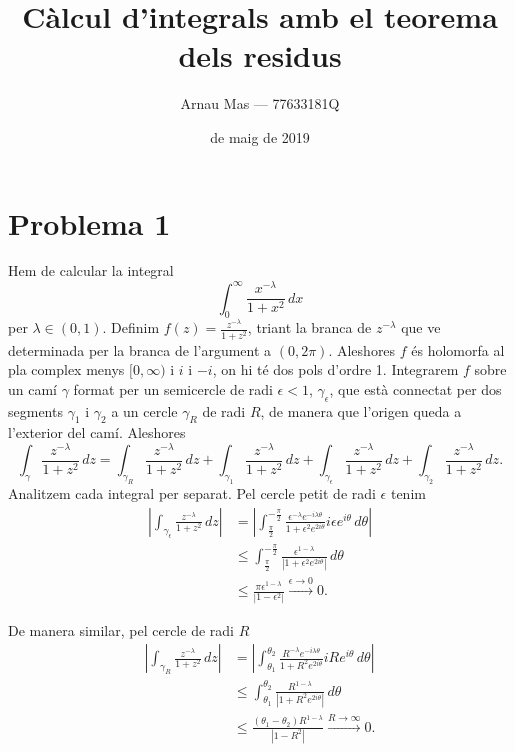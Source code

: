 \documentclass[12pt]{article}
\title{\sffamily {\bfseries Seminari 2:} Càlcul d'integrals amb el teorema dels residus}
\author{\sffamily Arnau Mas --- 77633181Q}
\date{\sffamily 17 de maig de 2019}
\numberwithin{table}{section}
\numberwithin{figure}{section}
\numberwithin{equation}{section}
\newcommand{\abs}[1]{\left\lvert #1 \right\rvert}
\begin{document}
\maketitle

\section*{Problema 1}
Hem de calcular la integral
\begin{equation*}
	\int_0^\infty \frac{x^{-\lambda}}{1 + x^2} \, dx
\end{equation*}
per \( \lambda \in (0,1) \). Definim \( f(z) = \frac{z^{-\lambda}}{1 + z^2} \), triant la branca de \( z^{-\lambda} \) que ve determinada per la branca de l'argument a \( (0, 2\pi) \). Aleshores \( f \) és holomorfa al pla complex menys \( [0, \infty) \) i \( i \) i \( -i \), on hi té dos pols d'ordre 1. Integrarem \( f \) sobre un camí \( \gamma \) format per un semicercle de radi \( \epsilon < 1 \), \( \gamma_\epsilon \), que està connectat per dos segments \( \gamma_1 \) i \( \gamma_2 \) a un cercle \( \gamma_R \) de radi \( R \), de manera que l'origen queda a l'exterior del camí. Aleshores
\begin{equation*}
	\int_\gamma \frac{z^{-\lambda}}{1 + z^2} \, dz = \int_{\gamma_R} \frac{z^{-\lambda}}{1 + z^2} \, dz + \int_{\gamma_1} \frac{z^{-\lambda}}{1 + z^2} \, dz + \int_{\gamma_\epsilon} \frac{z^{-\lambda}}{1 + z^2} \, dz + \int_{\gamma_2} \frac{z^{-\lambda}}{1 + z^2} \, dz.
\end{equation*}
Analitzem cada integral per separat. Pel cercle petit de radi \( \epsilon \) tenim
\begin{align*}
	\abs{\int_{\gamma_\epsilon} \frac{z^{-\lambda}}{1 + z^2} \, dz} & = \abs{\int_{\frac{\pi}{2}}^{-\frac{\pi}{2}} \frac{\epsilon^{-\lambda}e^{-i\lambda\theta}}{1 + \epsilon^2 e^{2i\theta}} i\epsilon e^{i\theta} \, d\theta} \\
																																	& \leq \int_{\frac{\pi}{2}}^{-\frac{\pi}{2}} \frac{\epsilon^{1 - \lambda}}{\abs{1 + \epsilon^2 e^{2i\theta}}} \, d\theta \\
																																	& \leq \frac{\pi\epsilon^{1 - \lambda}}{\abs{1 - \epsilon^2}} \xrightarrow{\epsilon \to 0} 0.
\end{align*}

De manera similar, pel cercle de radi \( R \)
\begin{align*}
	\abs{\int_{\gamma_R} \frac{z^{-\lambda}}{1 + z^2} \, dz} & = \abs{\int_{\theta_1}^{\theta_2} \frac{R^{-\lambda}e^{-i\lambda\theta}}{1 + R^2 e^{2i\theta}} iR e^{i\theta} \, d\theta} \\
																													 & \leq \int_{\theta_1}^{\theta_2} \frac{R^{1 - \lambda}}{\abs{1 + R^2 e^{2i\theta}}} \, d\theta \\
																													 & \leq \frac{(\theta_1 - \theta_2) R^{1 - \lambda}}{\abs{1 - R^2}} \xrightarrow{R \to \infty} 0.
\end{align*}
\end{document}
